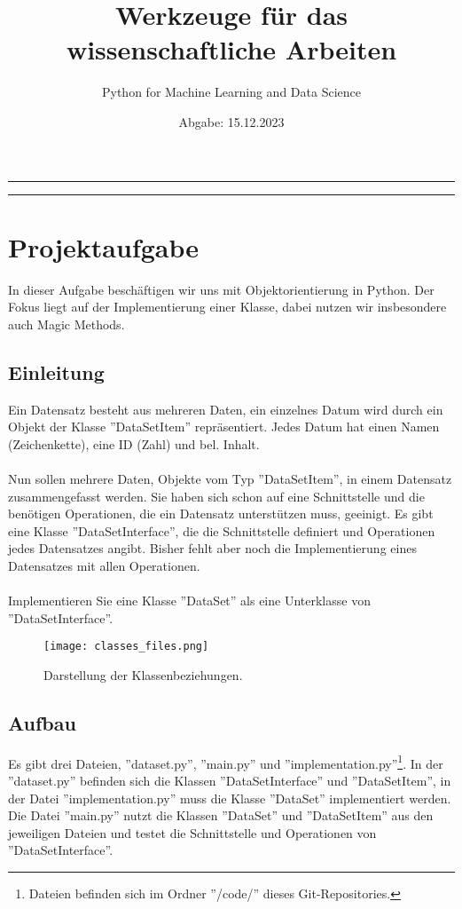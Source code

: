 \documentclass[
12pt, %
a4paper, %
parskip=full %
]{scrartcl}
\begin{document}
\title{Werkzeuge für das wissenschaftliche Arbeiten}
\subtitle{Python for Machine Learning and Data Science}
\date{Abgabe: 15.12.2023}
\maketitle
\hrule
\tableofcontents
\vspace{30pt}
\hrule
\section{Projektaufgabe}
In dieser Aufgabe beschäftigen wir uns mit Objektorientierung in Python. Der Fokus liegt auf der Implementierung einer Klasse, dabei nutzen wir insbesondere auch Magic Methods.\\
\subsection{Einleitung}
Ein Datensatz besteht aus mehreren Daten, ein einzelnes Datum wird durch ein Objekt der Klasse ''DataSetItem'' repräsentiert. Jedes Datum hat einen Namen
(Zeichenkette), eine ID (Zahl) und bel. Inhalt.\\\\
Nun sollen mehrere Daten, Objekte vom Typ ''DataSetItem'', in einem Datensatz zusammengefasst werden. Sie haben sich schon auf eine Schnittstelle und
die benötigen Operationen, die ein Datensatz unterstützen muss, geeinigt. Es
gibt eine Klasse ''DataSetInterface'', die die Schnittstelle definiert und Operationen jedes Datensatzes angibt. Bisher fehlt aber noch die Implementierung eines Datensatzes mit allen Operationen.\\\\
Implementieren Sie eine Klasse ''DataSet'' als eine Unterklasse von ''DataSetInterface''.\\
\begin{figure}[h]
\centering
\texttt{[image: classes\_files.png]}
\caption{Darstellung der Klassenbeziehungen.}
\label{fig:dur}
\end{figure}
\subsection{Aufbau}
Es gibt drei Dateien, ''dataset.py'', ''main.py'' und ''implementation.py''\footnote{Dateien befinden sich im Ordner ''/code/'' dieses Git-Repositories.}. In der ''dataset.py'' befinden sich die Klassen ''DataSetInterface'' und ''DataSetItem'', in der Datei ''implementation.py'' muss die Klasse ''DataSet'' implementiert werden. Die Datei ''main.py'' nutzt die Klassen ''DataSet'' und ''DataSetItem'' aus den jeweiligen Dateien und testet die Schnittstelle und Operationen von ''DataSetInterface''.\\
\end{document}
